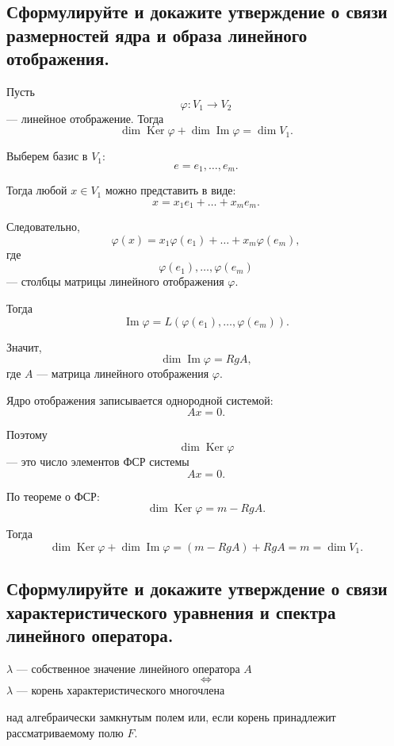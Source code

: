 \subsection{Сформулируйте и докажите утверждение о связи размерностей ядра и образа линейного отображения.}
\begin{theorem}
    Пусть
    \[
        \varphi: V_1 \to V_2
    \]
    --- линейное отображение. Тогда
    \[
        \dim \operatorname{Ker}\varphi + \dim \operatorname{Im}\varphi
        =
        \dim V_1.
    \]
\end{theorem}

\begin{Proof}
    Выберем базис в $V_1$:
    \[
        e = e_1,\ldots,e_m.
    \]
    
    Тогда любой $x \in V_1$ можно представить в виде:
    \[
        x = x_1e_1 + \ldots + x_me_m.
    \]
    
    Следовательно,
    \[
        \varphi(x)
        =
        x_1\varphi(e_1) + \ldots + x_m\varphi(e_m),
    \]
    где
    \[
        \varphi(e_1),\ldots,\varphi(e_m)
    \]
    --- столбцы матрицы линейного отображения $\varphi$.
    
    Тогда
    \[
        \operatorname{Im}\varphi
        =
        L(\varphi(e_1),\ldots,\varphi(e_m)).
    \]
    
    Значит,
    \[
        \dim \operatorname{Im}\varphi = RgA,
    \]
    где $A$ --- матрица линейного отображения $\varphi$.
    
    Ядро отображения записывается однородной системой:
    \[
        Ax = 0.
    \]
    
    Поэтому
    \[
        \dim \operatorname{Ker}\varphi
    \]
    --- это число элементов ФСР системы
    \[
        Ax = 0.
    \]
    
    По теореме о ФСР:
    \[
        \dim \operatorname{Ker}\varphi = m - RgA.
    \]
    
    Тогда
    \[
        \dim \operatorname{Ker}\varphi + \dim \operatorname{Im}\varphi
        =
        (m - RgA) + RgA
        =
        m
        =
        \dim V_1.
    \]
\end{Proof}
\subsection{Сформулируйте и докажите утверждение о связи характеристического уравнения и спектра линейного оператора.}

\begin{theorem}
    $\lambda$ --- собственное значение линейного оператора $A$
    \[
        \Longleftrightarrow
    \]
    $\lambda$ --- корень характеристического многочлена
    
    над алгебраически замкнутым полем или, если корень принадлежит рассматриваемому полю $F$.
\end{theorem}

